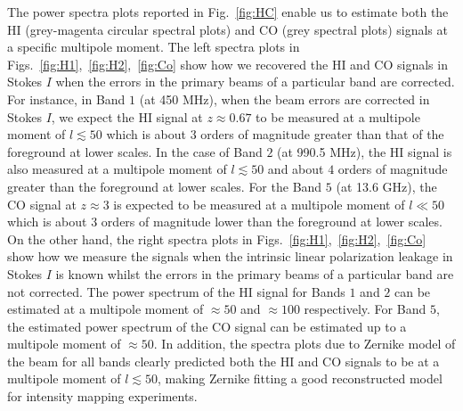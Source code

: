The power spectra plots reported in Fig.~\ref{fig:HC} enable us to estimate both the HI (grey-magenta circular spectral plots) and CO (grey spectral plots) signals at a specific
multipole moment. The left spectra plots in Figs.~\ref{fig:H1},~\ref{fig:H2},~\ref{fig:Co} show how we recovered the HI and CO signals in Stokes $I$ when the errors 
in the primary beams of a particular band are corrected. For instance, in Band $1$ (at 450 MHz), when the beam errors are corrected in Stokes $I$, we expect 
the HI signal at $z \approx 0.67$ to be measured at a multipole moment of $l \lesssim 50$ which is about $3$ orders of magnitude greater than that of the foreground at lower scales. 
In the case of Band $2$ (at 990.5 MHz), the HI signal is also measured at a multipole moment of $l \lesssim 50$ and about $4$ orders of magnitude greater than the foreground at lower scales. For the Band $5$ (at 13.6 GHz),
the CO signal at $z \approx 3$ is expected to be measured at a multipole moment of $l \ll 50$ which is about $3$ orders of magnitude lower than the foreground at lower scales. 
On the other hand, the right spectra plots in Figs.~\ref{fig:H1},~\ref{fig:H2},~\ref{fig:Co} show how we measure the signals when the intrinsic linear polarization leakage in Stokes $I$ is known
whilst the  errors in the primary beams of a particular band are not corrected. The power spectrum of the HI signal for Bands $1$ and $2$ can be estimated at a 
multipole moment of $\approx 50$ and $\approx 100$ respectively. For Band $5$, the estimated power spectrum of the CO signal can be estimated up to
a multipole moment of $\approx 50$. In addition, the spectra plots due to Zernike model of the beam for all bands clearly predicted both the HI and CO signals to be 
at a multipole moment of $l \lesssim 50$, making Zernike fitting a good  reconstructed model for intensity mapping experiments.

